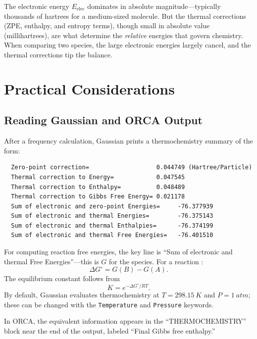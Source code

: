 \documentclass[11pt]{article}
\numberwithin{equation}{section}
\begin{document}
The electronic energy $E_\text{elec}$ dominates in absolute magnitude---typically thousands of hartrees for a medium-sized molecule. But the thermal corrections (ZPE, enthalpy, and entropy terms), though small in absolute value (millihartrees), are what determine the \emph{relative} energies that govern chemistry. When comparing two species, the large electronic energies largely cancel, and the thermal corrections tip the balance.


\section{Practical Considerations}
\label{sec:practical}

\subsection{Reading Gaussian and ORCA Output}

After a frequency calculation, Gaussian prints a thermochemistry summary of the form:
\begin{verbatim}
  Zero-point correction=                   0.044749 (Hartree/Particle)
  Thermal correction to Energy=            0.047545
  Thermal correction to Enthalpy=          0.048489
  Thermal correction to Gibbs Free Energy= 0.021178
  Sum of electronic and zero-point Energies=     -76.377939
  Sum of electronic and thermal Energies=        -76.375143
  Sum of electronic and thermal Enthalpies=      -76.374199
  Sum of electronic and thermal Free Energies=   -76.401510
\end{verbatim}

For computing reaction free energies, the key line is ``Sum of electronic and thermal Free Energies''---this is $G$ for the species. For a reaction :
\begin{equation}
\Delta G^\circ = G(B) - G(A).
\end{equation}
The equilibrium constant follows from
\begin{equation}
K = e^{-\Delta G^\circ/RT}.
\end{equation}
By default, Gaussian evaluates thermochemistry at $T = \SI{298.15}{K}$ and $P = \SI{1}{atm}$; these can be changed with the \texttt{Temperature} and \texttt{Pressure} keywords.

In ORCA, the equivalent information appears in the ``THERMOCHEMISTRY'' block near the end of the output, labeled ``Final Gibbs free enthalpy.''
\end{document}
